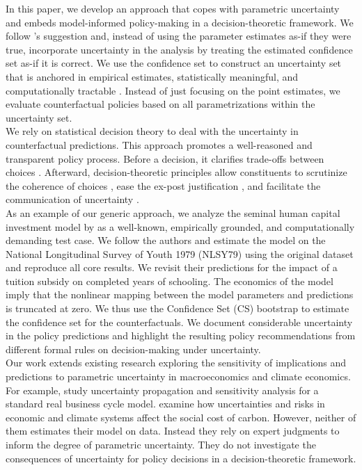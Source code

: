 {\noindent In this paper, we develop an approach that copes with parametric uncertainty and embeds model-informed policy-making in a decision-theoretic framework. We follow \cite{Manski.2021}'s suggestion and, instead of using the parameter estimates as-if they were true, incorporate uncertainty in the analysis by treating the estimated confidence set as-if it is correct. We use the confidence set to construct an uncertainty set that is anchored in empirical estimates, statistically meaningful, and computationally tractable \cite{Ben-Tal.2013}. Instead of just focusing on the point estimates, we evaluate counterfactual policies based on all parametrizations within the uncertainty set.\\

\noindent We rely on statistical decision theory \cite{Manski.2013} to deal with the uncertainty in counterfactual predictions. This approach promotes a well-reasoned and transparent policy process. Before a decision, it clarifies trade-offs between choices \cite{Gilboa.2018}. Afterward, decision-theoretic principles allow constituents to scrutinize the coherence of choices \cite{Gilboa.2020}, ease the ex-post justification \cite{Berger.2021}, and facilitate the communication of uncertainty \cite{Manski.2019}.\\

\noindent As an example of our generic approach, we analyze the seminal human capital investment model by  \cite{Keane.1997} as a well-known, empirically grounded, and computationally demanding test case. We follow the authors and estimate the model on the National Longitudinal Survey of Youth 1979 (NLSY79) \cite{NLSY.2019} using the original dataset and reproduce all core results. We revisit their predictions for the impact of a tuition subsidy on completed years of schooling. The economics of the model imply that the nonlinear mapping between the model parameters and predictions is truncated at zero. We thus use the Confidence Set (CS) bootstrap \cite{Woutersen.2019} to estimate the confidence set for the counterfactuals. We document considerable uncertainty in the policy predictions and highlight the resulting policy recommendations from different formal rules on decision-making under uncertainty. \\

\noindent Our work extends existing research exploring the sensitivity of implications and predictions to parametric uncertainty in macroeconomics and climate economics. For example, \cite{Harenberg.2019} study uncertainty propagation and sensitivity analysis for a standard real business cycle model. \cite{Cai.2019} examine how uncertainties and risks in economic and climate systems affect the social cost of carbon. However, neither of them estimates their model on data. Instead they rely on expert judgments to inform the degree of parametric uncertainty. They do not investigate the consequences of uncertainty for policy decisions in a decision-theoretic framework.\\

}
